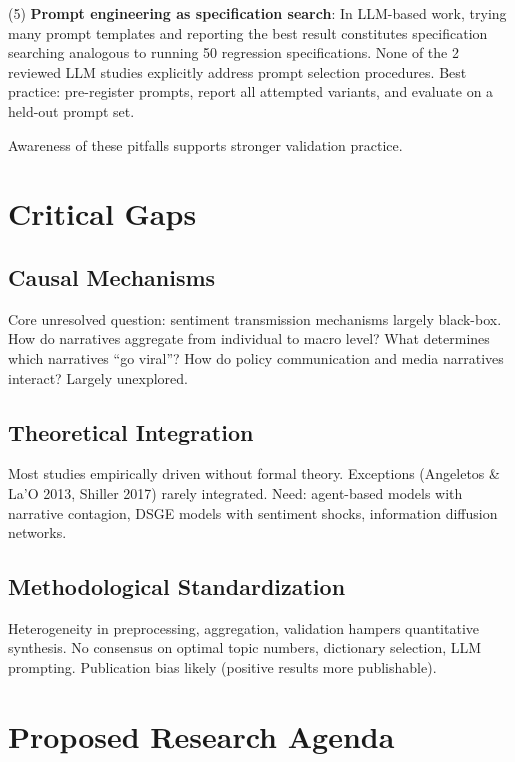 \documentclass[11pt,twocolumn]{article}
\begin{document}
\noindent
(5) \textbf{Prompt engineering as specification search}: In LLM-based work, trying many prompt templates and reporting the best result constitutes specification searching analogous to running 50 regression specifications. None of the 2 reviewed LLM studies explicitly address prompt selection procedures. Best practice: pre-register prompts, report all attempted variants, and evaluate on a held-out prompt set.

Awareness of these pitfalls supports stronger validation practice.

\section{Critical Gaps}

\subsection{Causal Mechanisms}

Core unresolved question: sentiment transmission mechanisms largely black-box. How do narratives aggregate from individual to macro level? What determines which narratives ``go viral''? How do policy communication and media narratives interact? Largely unexplored.

\subsection{Theoretical Integration}

Most studies empirically driven without formal theory. Exceptions (Angeletos \& La'O 2013, Shiller 2017) rarely integrated. Need: agent-based models with narrative contagion, DSGE models with sentiment shocks, information diffusion networks.

\subsection{Methodological Standardization}

Heterogeneity in preprocessing, aggregation, validation hampers quantitative synthesis. No consensus on optimal topic numbers, dictionary selection, LLM prompting. Publication bias likely (positive results more publishable).

\section{Proposed Research Agenda}
\end{document}
